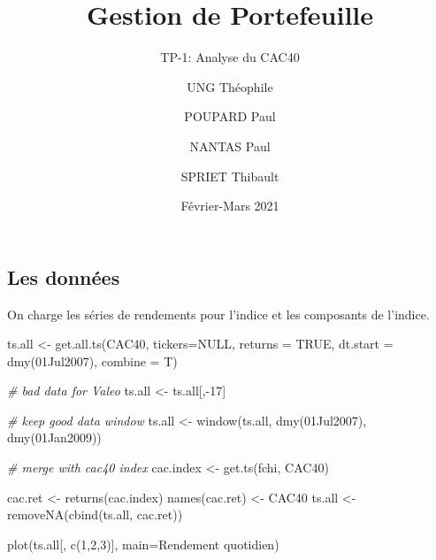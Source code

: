 \documentclass[
]{article}
\title{Gestion de Portefeuille}
\subtitle{TP-1: Analyse du CAC40}
\author{UNG Théophile \and POUPARD Paul \and NANTAS Paul \and SPRIET
Thibault}
\date{Février-Mars 2021}
\newenvironment{Shaded}{\begin{snugshade}}{\end{snugshade}}
\newcommand{\AttributeTok}[1]{\textcolor[rgb]{0.77,0.63,0.00}{#1}}
\newcommand{\CommentTok}[1]{\textcolor[rgb]{0.56,0.35,0.01}{\textit{#1}}}
\newcommand{\ConstantTok}[1]{\textcolor[rgb]{0.00,0.00,0.00}{#1}}
\newcommand{\DecValTok}[1]{\textcolor[rgb]{0.00,0.00,0.81}{#1}}
\newcommand{\FunctionTok}[1]{\textcolor[rgb]{0.00,0.00,0.00}{#1}}
\newcommand{\NormalTok}[1]{#1}
\newcommand{\OtherTok}[1]{\textcolor[rgb]{0.56,0.35,0.01}{#1}}
\newcommand{\SpecialCharTok}[1]{\textcolor[rgb]{0.00,0.00,0.00}{#1}}
\newcommand{\StringTok}[1]{\textcolor[rgb]{0.31,0.60,0.02}{#1}}
\begin{document}
\maketitle

\hypertarget{les-donnuxe9es}{%
\subsection{Les données}\label{les-donnuxe9es}}

On charge les séries de rendements pour l'indice et les composants de
l'indice.

\begin{Shaded}
\begin{Highlighting}[]
\NormalTok{  ts.all }\OtherTok{\textless{}{-}} \FunctionTok{get.all.ts}\NormalTok{(}\StringTok{\textquotesingle{}CAC40\textquotesingle{}}\NormalTok{, }\AttributeTok{tickers=}\ConstantTok{NULL}\NormalTok{, }\AttributeTok{returns =} \ConstantTok{TRUE}\NormalTok{,}
    \AttributeTok{dt.start =} \FunctionTok{dmy}\NormalTok{(}\StringTok{\textquotesingle{}01Jul2007\textquotesingle{}}\NormalTok{), }\AttributeTok{combine =}\NormalTok{ T)}
  
  \CommentTok{\# bad data for Valeo}
\NormalTok{  ts.all }\OtherTok{\textless{}{-}}\NormalTok{ ts.all[,}\SpecialCharTok{{-}}\DecValTok{17}\NormalTok{]}
  
  \CommentTok{\# keep good data window}
\NormalTok{  ts.all }\OtherTok{\textless{}{-}} \FunctionTok{window}\NormalTok{(ts.all, }\FunctionTok{dmy}\NormalTok{(}\StringTok{\textquotesingle{}01Jul2007\textquotesingle{}}\NormalTok{), }
                   \FunctionTok{dmy}\NormalTok{(}\StringTok{\textquotesingle{}01Jan2009\textquotesingle{}}\NormalTok{))}
  
  \CommentTok{\# merge with cac40 index}
\NormalTok{  cac.index }\OtherTok{\textless{}{-}} \FunctionTok{get.ts}\NormalTok{(}\StringTok{\textquotesingle{}fchi\textquotesingle{}}\NormalTok{, }\StringTok{\textquotesingle{}CAC40\textquotesingle{}}\NormalTok{)}

\NormalTok{  cac.ret }\OtherTok{\textless{}{-}} \FunctionTok{returns}\NormalTok{(cac.index)}
  \FunctionTok{names}\NormalTok{(cac.ret) }\OtherTok{\textless{}{-}} \StringTok{\textquotesingle{}CAC40\textquotesingle{}}
\NormalTok{  ts.all }\OtherTok{\textless{}{-}} \FunctionTok{removeNA}\NormalTok{(}\FunctionTok{cbind}\NormalTok{(ts.all, cac.ret))}
\end{Highlighting}
\end{Shaded}

\begin{Shaded}
\begin{Highlighting}[]
\FunctionTok{plot}\NormalTok{(ts.all[, }\FunctionTok{c}\NormalTok{(}\DecValTok{1}\NormalTok{,}\DecValTok{2}\NormalTok{,}\DecValTok{3}\NormalTok{)], }\AttributeTok{main=}\StringTok{\textquotesingle{}Rendement quotidien\textquotesingle{}}\NormalTok{)}
\end{Highlighting}
\end{Shaded}
\end{document}
